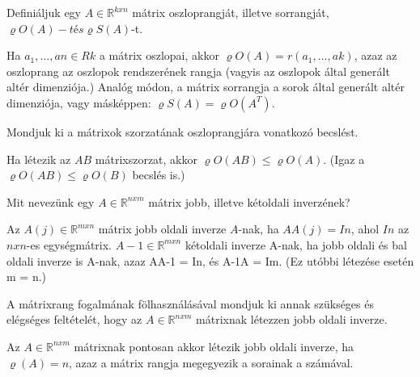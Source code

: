 \begin{frame}
  \begin{tcolorbox}[title={14}]
    Definiáljuk egy $A \in \mathbb{R}^{k x n}$ mátrix oszloprangját, illetve sorrangját, ${\varrho}O(A)-t és {\varrho}S(A)$-t.

  \tcblower
Ha $a_1,...,an \in Rk$ a mátrix oszlopai, akkor ${\varrho}O(A) = r(a_1,...,ak)$, azaz az oszloprang az oszlopok rendszerének rangja (vagyis az oszlopok által generált altér dimenziója.) Analóg módon, a mátrix sorrangja a sorok által generált altér dimenziója, vagy másképpen: ${\varrho}S(A) = {\varrho}O(A^T)$.

  \end{tcolorbox}
\end{frame}

\begin{frame}
  \begin{tcolorbox}[title={15}]
   Mondjuk ki a mátrixok szorzatának oszloprangjára vonatkozó becslést.


  \tcblower
Ha létezik az $AB$ mátrixszorzat, akkor ${\varrho}O(AB) \leq {\varrho}O(A)$. (Igaz a ${\varrho}O(AB) \leq {\varrho}O(B)$ becslés is.)

  \end{tcolorbox}
\end{frame}


\begin{frame}
  \begin{tcolorbox}[title={16}]
     Mit nevezünk egy $A \in \mathbb{R}^{n x m}$ mátrix jobb, illetve kétoldali inverzének?

  \tcblower
Az $A(j) \in \mathbb{R}^{m x n}$ mátrix jobb oldali inverze $A$-nak, ha $AA(j) = In$, ahol $In$ az $n x n$-es egységmátrix. $A-1 \in \mathbb{R}^{m x n}$ kétoldali inverze A-nak, ha jobb oldali és bal oldali inverze is A-nak, azaz AA-1 = In, és A-1A = Im. (Ez utóbbi létezése esetén m = n.)

  \end{tcolorbox}
\end{frame}


\begin{frame}
  \begin{tcolorbox}[title={17}]
    A mátrixrang fogalmának fölhasználásával mondjuk ki annak szükséges és elégséges feltételét, hogy az $A \in \mathbb{R}^{n x m}$ mátrixnak létezzen jobb oldali inverze.

  \tcblower
Az $A \in \mathbb{R}^{n x m}$ mátrixnak pontosan akkor létezik jobb oldali inverze, ha ${\varrho}(A) = n$, azaz a mátrix rangja megegyezik a sorainak a számával.

  \end{tcolorbox}
\end{frame}


